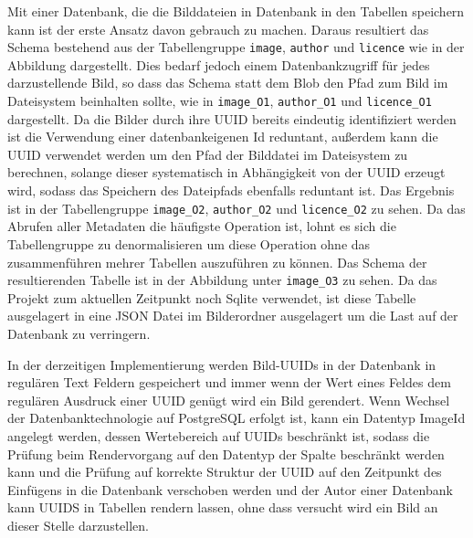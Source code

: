 Mit einer Datenbank, die die Bilddateien in Datenbank in den Tabellen speichern
kann ist der erste Ansatz davon gebrauch zu machen. Daraus resultiert das Schema
bestehend aus der Tabellengruppe \texttt{image}, \texttt{author} und
\texttt{licence} wie in der Abbildung dargestellt. Dies bedarf jedoch einem
Datenbankzugriff für jedes darzustellende Bild, so dass das Schema statt dem
Blob den Pfad zum Bild im Dateisystem beinhalten sollte, wie in
\texttt{image\_O1}, \texttt{author\_O1} und \texttt{licence\_O1} dargestellt. Da
die Bilder durch ihre UUID bereits eindeutig identifiziert werden ist die
Verwendung einer datenbankeigenen Id reduntant, außerdem kann die UUID verwendet
werden um den Pfad der Bilddatei im Dateisystem zu berechnen, solange dieser
systematisch in Abhängigkeit von der UUID erzeugt wird, sodass das Speichern des
Dateipfads ebenfalls reduntant ist. Das Ergebnis ist in der Tabellengruppe
\texttt{image\_O2}, \texttt{author\_O2} und \texttt{licence\_O2} zu sehen. Da
das Abrufen aller Metadaten die häufigste Operation ist, lohnt es sich die
Tabellengruppe zu denormalisieren um diese Operation ohne das zusammenführen
mehrer Tabellen auszuführen zu können. Das Schema der resultierenden Tabelle ist
in der Abbildung unter \texttt{image\_O3} zu sehen. Da das Projekt zum aktuellen
Zeitpunkt noch Sqlite verwendet, ist diese Tabelle ausgelagert in eine JSON
Datei im Bilderordner ausgelagert um die Last auf der Datenbank zu verringern.

In der derzeitigen Implementierung werden Bild-UUIDs in der Datenbank in
regulären Text Feldern gespeichert und immer wenn der Wert eines Feldes dem
regulären Ausdruck einer UUID genügt wird ein Bild gerendert. Wenn Wechsel der
Datenbanktechnologie auf PostgreSQL erfolgt ist, kann ein Datentyp ImageId
angelegt werden, dessen Wertebereich auf UUIDs beschränkt ist, sodass die
Prüfung beim Rendervorgang auf den Datentyp der Spalte beschränkt werden kann
und die Prüfung auf korrekte Struktur der UUID auf den Zeitpunkt des Einfügens
in die Datenbank verschoben werden und der Autor einer Datenbank kann UUIDS in
Tabellen rendern lassen, ohne dass versucht wird ein Bild an dieser Stelle
darzustellen.

